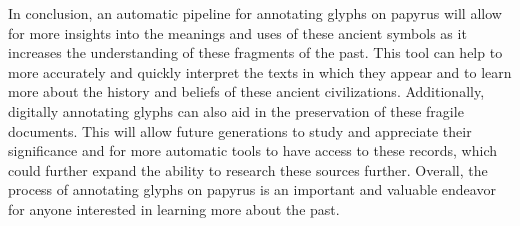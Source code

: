 
In conclusion, an automatic pipeline for annotating glyphs on papyrus will allow for more insights into the meanings and uses of these ancient symbols as it increases the understanding of these fragments of the past. This tool can help to more accurately and quickly interpret the texts in which they appear and to learn more about the history and beliefs of these ancient civilizations. Additionally, digitally annotating glyphs can also aid in the preservation of these fragile documents. This will allow future generations to study and appreciate their significance and for more automatic tools to have access to these records, which could further expand the ability to research these sources further. Overall, the process of annotating glyphs on papyrus is an important and valuable endeavor for anyone interested in learning more about the past.
